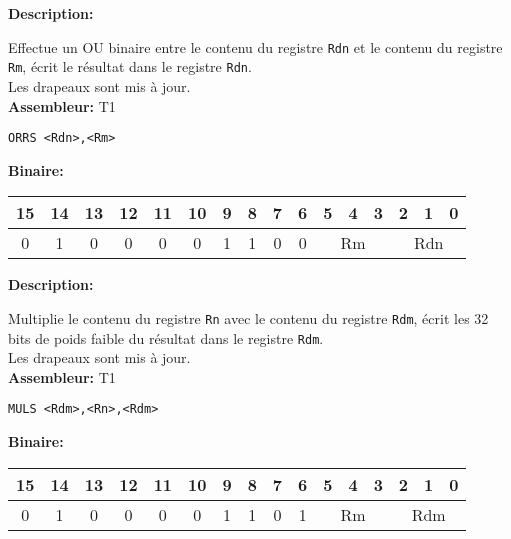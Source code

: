 
\textbf{Description: }

Effectue un OU binaire entre le contenu du registre \texttt{Rdn} et le contenu du registre \texttt{Rm}, écrit le résultat dans le registre \texttt{Rdn}.\\
Les drapeaux sont mis à jour.\\

\textbf{Assembleur:} T1

\begin{lstlisting}
ORRS <Rdn>,<Rm>
\end{lstlisting}

\textbf{Binaire:}\\

\begin{tabular}{| c c c c c c c c c c c c c c c c |}
\hline
15 & 14 & 13 & 12 & 11 & 10 & \multicolumn{1}{|c}{9} & 8 & 7 & 6 & \multicolumn{1}{|c}{5} & 4 & 3 & \multicolumn{1}{|c}{2} & 1 & 0 \\
\hline
0 & 1 & 0 & 0 & 0 & 0 & \multicolumn{1}{|c}{1} & 1 & 0 & 0 & \multicolumn{3}{|c}{Rm} & \multicolumn{3}{|c|}{Rdn} \\
\hline
\end{tabular}



\textbf{Description: }

Multiplie le contenu du registre \texttt{Rn} avec le contenu du registre \texttt{Rdm}, écrit les 32 bits de poids faible du résultat dans le registre \texttt{Rdm}.\\
Les drapeaux sont mis à jour.\\

\textbf{Assembleur:} T1

\begin{lstlisting}
MULS <Rdm>,<Rn>,<Rdm>
\end{lstlisting}

\textbf{Binaire:}\\

\begin{tabular}{| c c c c c c c c c c c c c c c c |}
\hline
15 & 14 & 13 & 12 & 11 & 10 & \multicolumn{1}{|c}{9} & 8 & 7 & 6 & \multicolumn{1}{|c}{5} & 4 & 3 & \multicolumn{1}{|c}{2} & 1 & 0 \\
\hline
0 & 1 & 0 & 0 & 0 & 0 & \multicolumn{1}{|c}{1} & 1 & 0 & 1 & \multicolumn{3}{|c}{Rm} & \multicolumn{3}{|c|}{Rdm} \\
\hline
\end{tabular}



